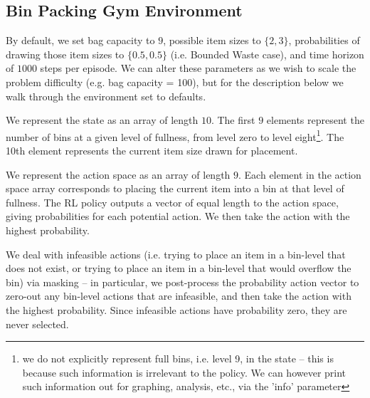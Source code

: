 \appendix
\appendixpage
\begin{appendices}
\section{Bin Packing Gym Environment}
\label{sec:bin_packing_gym}

By default, we set bag capacity to $9$, possible item sizes to $\{2, 3\}$, probabilities of drawing those item sizes to $\{0.5, 0.5\}$ (i.e. Bounded Waste case), and time horizon of $1000$ steps per episode.  We can alter these parameters as we wish to scale the problem difficulty (e.g. bag capacity = 100), but for the description below we walk through the environment set to defaults.  

We represent the state as an array of length $10$.  The first $9$ elements represent the number of bins at a given level of fullness, from level zero to level eight\footnote{we do not explicitly represent full bins, i.e. level 9, in the state -- this is because such information is irrelevant to the policy.  We can however print such information out for graphing, analysis, etc., via the 'info' parameter}.  The 10th element represents the current item size drawn for placement.  

We represent the action space as an array of length $9$.  Each element in the action space array corresponds to placing the current item into a bin at that level of fullness.  The RL policy outputs a vector of equal length to the action space, giving probabilities for each potential action.  We then take the action with the highest probability.  

We deal with infeasible actions (i.e. trying to place an item in a bin-level that does not exist, or trying to place an item in a bin-level that would overflow the bin) via masking -- in particular, we post-process the probability action vector to zero-out any bin-level actions that are infeasible, and then take the action with the highest probability.  Since infeasible actions have probability zero, they are never selected.


\end{appendices}
